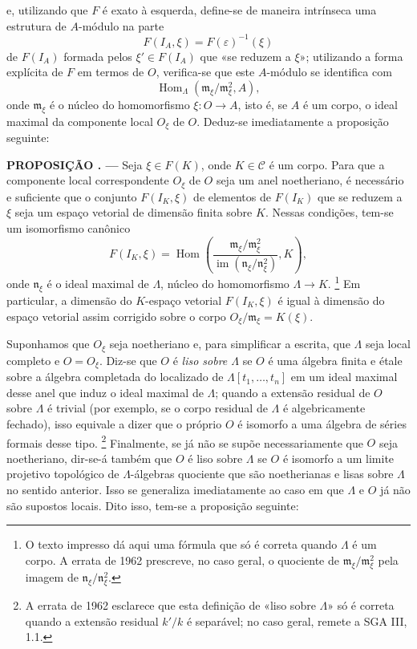 \documentclass[11pt,twoside,openany]{book}
\numberwithin{equation}{section}
\newcommand{\src}[1]{%
  \phantomsection\hypertarget{src:#1}{}%
  \marginpar{\raggedleft\footnotesize\sffamily #1}%
}
\theoremstyle{plain}
\theoremstyle{definition}
\theoremstyle{remark}
\newcommand{\result}[2]{%
  \par\medskip\noindent\textbf{#1%
  \if\relax\detokenize{#2}\relax\else\space#2\fi. ---}\enspace
}
\newcommand{\FgaUnitKey}{frontmatter}
\renewcommand{\src}[1]{%
  \phantomsection\hypertarget{src:\FgaUnitKey:#1}{}%
  \marginpar{\raggedleft\footnotesize\sffamily #1}%
}
\begin{document}
\src{376}
e, utilizando que $F$ é exato à esquerda, define-se de maneira
intrínseca uma estrutura de $A$-módulo na parte
\[
  F(I_A,\xi)=F(\varepsilon)^{-1}(\xi)
\]
de $F(I_A)$ formada pelos $\xi'\in F(I_A)$ que «se reduzem a $\xi$»;
utilizando a forma explícita de $F$ em termos de $O$, verifica-se que este
$A$-módulo se identifica com
\[
  \operatorname{Hom}_{\Lambda}(\mathfrak m_\xi/\mathfrak m_\xi^2,A),
\]
onde $\mathfrak m_\xi$ é o núcleo do homomorfismo
$\xi:O\longrightarrow A$, isto é, se $A$ é um corpo, o ideal maximal da
componente local $O_\xi$ de $O$. Deduz-se imediatamente a proposição
seguinte:

\result{PROPOSIÇÃO}{5.1} Seja $\xi\in F(K)$, onde $K\in\mathcal C$ é um
corpo. Para que a componente local correspondente $O_\xi$ de $O$ seja um
anel noetheriano, é necessário e suficiente que o conjunto $F(I_K,\xi)$ de
elementos de $F(I_K)$ que se reduzem a $\xi$ seja um espaço vetorial
de dimensão finita sobre $K$. Nessas condições, tem-se um isomorfismo
canônico
\[
  F(I_K,\xi)=
  \operatorname{Hom}\!\left(
    \frac{\mathfrak m_\xi/\mathfrak m_\xi^2}
         {\operatorname{im}(\mathfrak n_\xi/\mathfrak n_\xi^2)},K
  \right),
\]
onde $\mathfrak n_\xi$ é o ideal maximal de $\Lambda$, núcleo do
homomorfismo $\Lambda\longrightarrow K$.
\footnote{O texto impresso dá aqui uma fórmula que só é correta quando
$\Lambda$ é um corpo. A errata de 1962 prescreve, no caso geral,
o quociente de $\mathfrak m_\xi/\mathfrak m_\xi^2$ pela imagem de
$\mathfrak n_\xi/\mathfrak n_\xi^2$.}
Em particular, a dimensão do $K$-espaço vetorial $F(I_K,\xi)$ é igual à
dimensão do espaço vetorial assim corrigido sobre o corpo
$O_\xi/\mathfrak m_\xi=K(\xi)$.

Suponhamos que $O_\xi$ seja noetheriano e, para simplificar a escrita, que
$\Lambda$ seja local completo e $O=O_\xi$. Diz-se que $O$ é \emph{liso sobre
$\Lambda$} se $O$ é uma álgebra finita e étale sobre a álgebra completada do
localizado de $\Lambda[t_1,\ldots,t_n]$ em um ideal maximal desse anel que
induz o ideal maximal de $\Lambda$; quando a extensão residual de $O$ sobre
$\Lambda$ é trivial (por exemplo, se o corpo residual de $\Lambda$ é
algebricamente fechado), isso equivale a dizer que o próprio $O$ é isomorfo a uma
álgebra de séries formais desse tipo.
\footnote{A errata de 1962 esclarece que esta definição de «liso sobre
$\Lambda$» só é correta quando a extensão residual $k'/k$ é separável;
no caso geral, remete a SGA III, 1.1.}
Finalmente, se já não se supõe necessariamente que $O$ seja noetheriano, dir-se-á
também que $O$ é liso sobre $\Lambda$ se $O$ é isomorfo a um limite
projetivo topológico de $\Lambda$-álgebras quociente que são noetherianas e
lisas sobre $\Lambda$ no sentido anterior. Isso se generaliza imediatamente ao caso
em que $\Lambda$ e $O$ já não são supostos locais. Dito isso, tem-se a
proposição seguinte:
\end{document}
